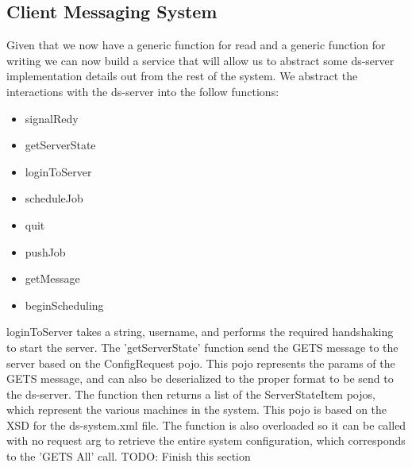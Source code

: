 \documentclass[12pt, letterpaper]{article}
\begin{document}
\subsection*{Client Messaging System}
Given that we now have a generic function for read and a generic function for writing we can now build a service that will allow us to abstract some ds-server implementation details out from the rest of the system.
We abstract the interactions with the ds-server into the follow functions:
\begin{itemize}
    \item signalRedy
    \item getServerState
    \item loginToServer
    \item scheduleJob
    \item quit
    \item pushJob
    \item getMessage
    \item beginScheduling
\end{itemize}
loginToServer takes a string, username, and performs the required handshaking to start the server.
The 'getServerState' function send the GETS message to the server based on the ConfigRequest pojo.
This pojo represents the params of the GETS message, and can also be deserialized to the proper format to be send to the ds-server.
The function then returns a list of the ServerStateItem pojos, which represent the various machines in the system. This pojo is based on the XSD for the ds-system.xml file.
The function is also overloaded so it can be called with no request arg to retrieve the entire system configuration, which corresponds to the 'GETS All' call.
TODO: Finish this section
\end{document}
